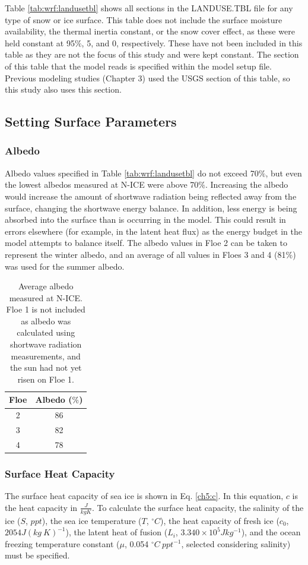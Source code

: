 Table \ref{tab:wrf:landusetbl} shows all sections in the LANDUSE.TBL file for any type of snow or ice surface. This table does not include the surface moisture availability, the thermal inertia constant, or the snow cover effect, as these were held constant at 95$\%$, 5, and 0, respectively. These have not been included in this table as they are not the focus of this study and were kept constant. The section of this table that the model reads is specified within the model setup file. Previous modeling studies (Chapter 3) used the USGS section of this table, so this study also uses this section.

\subsection{Setting Surface Parameters}
\subsubsection{Albedo}
Albedo values specified in Table \ref{tab:wrf:landusetbl} do not exceed 70$\%$, but even the lowest albedos measured at N-ICE were above 70$\%$. Increasing the albedo would increase the amount of shortwave radiation being reflected away from the surface, changing the shortwave energy balance. In addition, less energy is being absorbed into the surface than is occurring in the model. This could result in errors elsewhere (for example, in the latent heat flux) as the energy budget in the model attempts to balance itself. The albedo values in Floe 2 can be taken to represent the winter albedo, and an average of all values in Floes 3 and 4 (81$\%$) was used for the summer albedo.

\begin{table}[t]
\centering
\footnotesize
\doublespacing 
{
\begin{tabular}{| c | c |}
 \hline
\rowcolor[HTML]{F3F3F3} \textbf{Floe} & \textbf{Albedo ($\%$)} \\
\hline
2 & 86 \\
3 & 82 \\
4 & 78 \\
 \hline
\end{tabular}}
\caption[N-ICE average measured albedo.]{Average albedo measured at N-ICE. Floe 1 is not included as albedo was calculated using shortwave radiation measurements, and the sun had not yet risen on Floe 1.}
\label{tab:albedos}
\end{table}

\subsubsection{Surface Heat Capacity}
The surface heat capacity of sea ice is shown in Eq. \ref{ch5:c}. In this equation, $c$ is the heat capacity in $\frac{J}{kg K}$. To calculate the surface heat capacity, the salinity of the ice ($S$, $ppt$), the sea ice temperature ($T$, $^{\circ} C$), the heat capacity of fresh ice ($c_{0}$, $2054 J(kg~K)^{-1}$), the latent heat of fusion ($L_{i}$, $3.340 \times 10^{5} Jkg^{-1}$), and the ocean freezing temperature constant ($\mu$, 0.054 $^{\circ}C~ppt^{-1}$, selected considering salinity) must be specified. 


